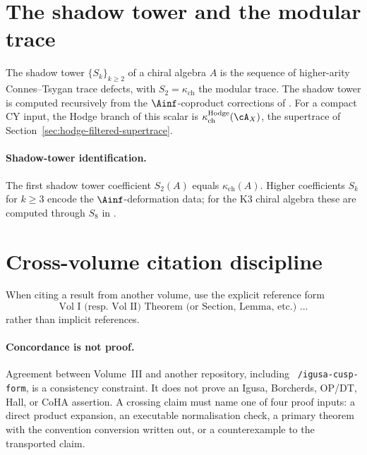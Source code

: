 \section{The shadow tower and the modular trace}
\label{sec:shadow-tower-convention}

The shadow tower $\{S_k\}_{k \geq 2}$ of a chiral algebra $A$ is the sequence
of higher-arity Connes--Tsygan trace defects, with $S_2 = \kappa_{\mathrm{ch}}$
the modular trace. The shadow tower is computed recursively from the
$\Ainf$-coproduct corrections of \cite{VolI}. For a compact CY input,
the Hodge branch of this scalar is
$\kappa_{\mathrm{ch}}^{\mathrm{Hodge}}(\cA_X)$, the supertrace of
Section~\ref{sec:hodge-filtered-supertrace}.

\paragraph{Shadow-tower identification.}
The first shadow tower coefficient $S_2(A)$ equals
$\kappa_{\mathrm{ch}}(A)$. Higher coefficients $S_k$ for $k \geq 3$ encode
the $\Ainf$-deformation data; for the K3 chiral algebra these are computed
through $S_8$ in \cite{VolI}.


\section{Cross-volume citation discipline}
\label{sec:cross-volume-citation}

When citing a result from another volume, use the explicit reference form
\[
 \text{Vol~I (resp.\ Vol~II) Theorem (or Section, Lemma, etc.) ...}
\]
rather than implicit references.

\paragraph{Concordance is not proof.}
Agreement between Volume~III and another repository, including
\texttt{\string~/igusa-cusp-form}, is a consistency constraint. It does
not prove an Igusa, Borcherds, OP/DT, Hall, or CoHA assertion. A crossing
claim must name one of four proof inputs: a direct product expansion, an
executable normalisation check, a primary theorem with the convention
conversion written out, or a counterexample to the transported claim.
